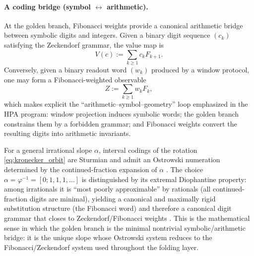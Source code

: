 \paragraph{A coding bridge (symbol $\leftrightarrow$ arithmetic).}
At the golden branch, Fibonacci weights provide a canonical arithmetic bridge between symbolic digits and integers.
Given a binary digit sequence $(c_k)$ satisfying the Zeckendorf grammar, the value map is
\[
V(c):=\sum_{k\ge 1} c_k F_{k+1}.
\]
Conversely, given a binary readout word $(w_k)$ produced by a window protocol, one may form a Fibonacci-weighted observable
\begin{equation}\label{eq:fib_weighted_readout}
Z:=\sum_{k\ge 1} w_k F_k,
\end{equation}
which makes explicit the ``arithmetic--symbol--geometry'' loop emphasized in the HPA program: window projection induces symbolic words; the golden branch constrains them by a forbidden grammar; and Fibonacci weights convert the resulting digits into arithmetic invariants.

\begin{remark}\label{rem:golden_branch_principled}
For a general irrational slope $\alpha$, interval codings of the rotation \eqref{eq:kronecker_orbit} are Sturmian and admit an Ostrowski numeration determined by the continued-fraction expansion of $\alpha$ \cite{Lothaire2002,AlloucheShallit2003}.
The choice $\alpha=\varphi^{-1}=[0;1,1,1,\dots]$ is distinguished by its extremal Diophantine property: among irrationals it is ``most poorly approximable'' by rationals (all continued-fraction digits are minimal), yielding a canonical and maximally rigid substitution structure (the Fibonacci word) and therefore a canonical digit grammar that closes to Zeckendorf/Fibonacci weights \cite{HardyWright2008,Lothaire2002}.
This is the mathematical sense in which the golden branch is the minimal nontrivial symbolic/arithmetic bridge: it is the unique slope whose Ostrowski system reduces to the Fibonacci/Zeckendorf system used throughout the folding layer.
\end{remark}


